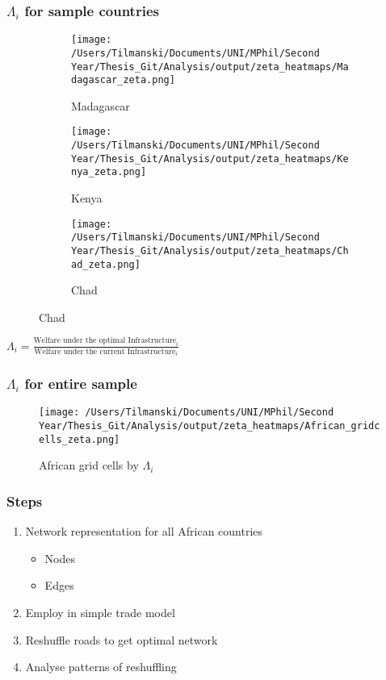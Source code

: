 \documentclass[]{beamer}   	%
\begin{document}
\begin{frame}
  \frametitle{$\Lambda_{i}$ for sample countries}
\begin{figure}
\caption{Local Infrastructure Discrimination Index $\Lambda_{i}$}
\begin{subfigure}[c]{0.32\textwidth}
\texttt{[image: /Users/Tilmanski/Documents/UNI/MPhil/Second Year/Thesis\_Git/Analysis/output/zeta\_heatmaps/Madagascar\_zeta.png]}
\caption{Madagascar}
\label{fig:Madagascar_zeta}
\end{subfigure}
\begin{subfigure}[c]{0.32\textwidth}
\texttt{[image: /Users/Tilmanski/Documents/UNI/MPhil/Second Year/Thesis\_Git/Analysis/output/zeta\_heatmaps/Kenya\_zeta.png]}
\caption{Kenya}
\label{fig:Kenya_zeta}
\end{subfigure}
\begin{subfigure}[c]{0.32\textwidth}
\texttt{[image: /Users/Tilmanski/Documents/UNI/MPhil/Second Year/Thesis\_Git/Analysis/output/zeta\_heatmaps/Chad\_zeta.png]}
\caption{Chad}
\label{fig:Chad_zeta}
\end{subfigure}
\end{figure}
\centering
$\Lambda_{i} = \frac{\textrm{Welfare under the optimal Infrastructure}_{i}}{\textrm{Welfare under the current Infrastructure}_{i}}$
\end{frame}

\begin{frame}
  \frametitle{$\Lambda_{i}$ for entire sample}
    \label{Grid_Cell_Map}
  \begin{figure}
    \texttt{[image: /Users/Tilmanski/Documents/UNI/MPhil/Second Year/Thesis\_Git/Analysis/output/zeta\_heatmaps/African\_gridcells\_zeta.png]}
    \caption{African grid cells by $\Lambda_{i}$}
  \end{figure}
  \hyperlink{backup:country_map}{}
\end{frame}

\begin{frame}
  \frametitle{Steps}
  \begin{enumerate}
    \item Network representation for all African countries
    \begin{itemize}
      \item Nodes
      \item Edges
    \end{itemize}
    \item Employ in simple trade model
    \item Reshuffle roads to get optimal network
    \item \alert{Analyse patterns of reshuffling}
  \end{enumerate}
\end{frame}
\end{document}
